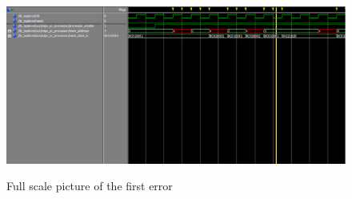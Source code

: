 \begin{figure}[h]
	\caption{Full scale picture of the first error}
	\includegraphics[scale=0.6, angle=90]{figures/pc_error_annhver_udefinert.png}
	\label{fig:error-1-landscape}
\end{figure}
